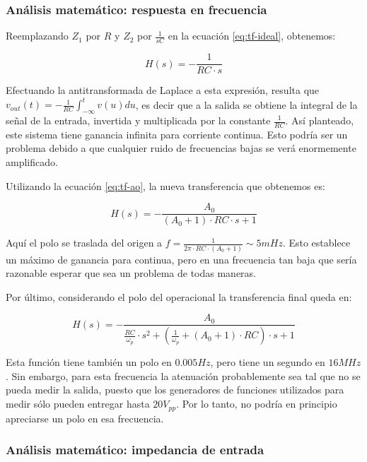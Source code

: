 \documentclass[../../main.tex]{subfiles}
\begin{document}
\subsubsection{An\'alisis matem\'atico: respuesta en frecuencia}

 Reemplazando $Z_1$ por $R$ y $Z_2$ por $\frac{1}{sC}$ en la ecuaci\'on \ref{eq:tf-ideal}, obtenemos:


\[ H(s) =  -\frac{1}{RC\cdot s}\]

Efectuando la antitransformada de Laplace a esta expresi\'on, resulta que $v_{out}(t) = -\frac{1}{RC} \int_{-\infty}^t v(u)du$, es decir que a la salida se obtiene la integral de la se\~nal de la entrada, invertida y multiplicada por la constante $\frac{1}{RC}$. As\'i planteado, este sistema tiene ganancia infinita para corriente continua. Esto podr\'ia ser un problema debido a que cualquier ruido de frecuencias bajas se ver\'a enormemente amplificado. \par

Utilizando la ecuaci\'on \ref{eq:tf-ao}, la nueva transferencia que obtenemos es:


\[ H(s) = -  \frac {A_0}{(A_0+1)\cdot RC \cdot s+1} \]

Aqu\'i el polo se traslada del origen a $f = \frac{1}{2\pi \cdot RC \cdot (A_0+1)} \sim 5mHz$. Esto establece un m\'aximo de ganancia para continua, pero en una frecuencia tan baja que ser\'ia razonable esperar que sea un problema de todas maneras. \par

Por \'ultimo, considerando el polo del operacional la transferencia final queda en:

\begin{equation}\label{eq:tf-int} H(s) = -\frac{A_0}{\frac{RC}{\omega_p} \cdot s^2 + \left(\frac{1}{\omega_p} + (A_0+1) \cdot RC\right) \cdot s +1} \end{equation}

Esta funci\'on tiene tambi\'en un polo en $0.005Hz$, pero tiene un segundo en $16MHz$. Sin embargo, para esta frecuencia la atenuaci\'on probablemente sea tal que no se pueda medir la salida, puesto que los generadores de funciones utilizados para medir s\'olo pueden entregar hasta $20V_{pp}$. Por lo tanto, no podr\'ia en principio apreciarse un polo en esa frecuencia.


\subsubsection{An\'alisis matem\'atico: impedancia de entrada}
\end{document}
